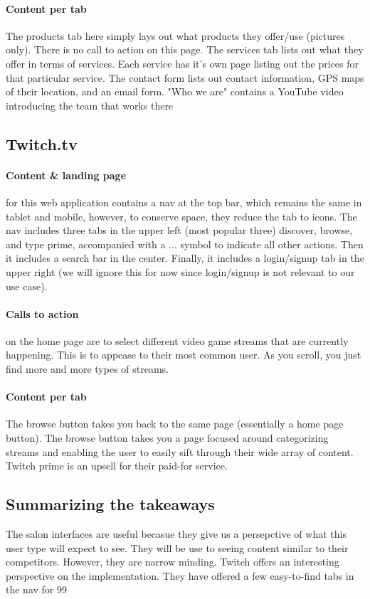 \paragraph{Content per tab}
The products tab here simply lays out what products they offer/use (pictures only). There is no call to action on this page. The services tab lists out what they offer in terms of services. Each service has it's own page listing out the prices for that particular service. The contact form lists out contact information, GPS maps of their location, and an email form. "Who we are" contains a YouTube video introducing the team that works there

\subsection{Twitch.tv}

\paragraph{Content & landing page}
for this web application contains a nav at the top bar, which remains the same in tablet and mobile, however, to conserve space, they reduce the tab to icons. The nav includes three tabs in the upper left (most popular three) discover, browse, and type prime, accompanied with a ... symbol to indicate all other actions. Then it includes a search bar in the center. Finally, it includes a login/signup tab in the upper right (we will ignore this for now since login/signup is not relevant to our use case).

\paragraph{Calls to action}
on the home page are to select different video game streams that are currently happening. This is to appease to their most common user. As you scroll, you just find more and more types of streams.

\paragraph{Content per tab}
The browse button takes you back to the same page (essentially a home page button). The browse button takes you a page focused around categorizing streams and enabling the user to easily sift through their wide array of content. Twitch prime is an upsell for their paid-for service.

\subsection{Summarizing the takeaways}
The salon interfaces are useful becasue they give us a persepctive of what this user type will expect to see. They will be use to seeing content similar to their competitors. However, they are narrow minding. Twitch offers an interesting perspective on the implementation. They have offered a few easy-to-find tabs in the nav for 99%

